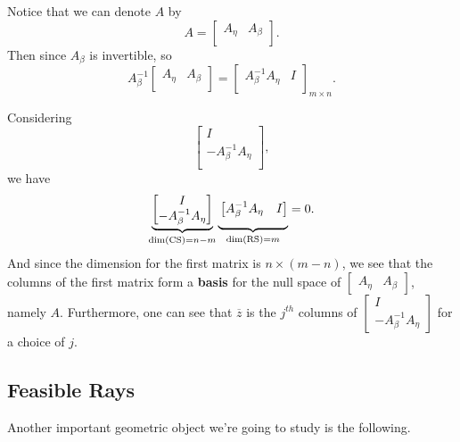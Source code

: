 \begin{note}
	Notice that we can denote \(A\) by
	\[
		A = \begin{bmatrix}
			A_{\eta} & A_{\beta} \\
		\end{bmatrix}.
	\]
	Then since \(A_{\beta}\) is invertible, so
	\[
		A^{-1}_{\beta}\begin{bmatrix}
			A_{\eta} & A_{\beta} \\
		\end{bmatrix} = \begin{bmatrix}
			A^{-1}_{\beta}A_{\eta} & I \\
		\end{bmatrix}_{m\times n}.
	\]

	Considering
	\[
		\begin{bmatrix}
			I                       \\
			-A^{-1}_{\beta}A_{\eta} \\
		\end{bmatrix},
	\]
	we have
	\[
		\underbrace{
			\begin{bmatrix}
				I                       \\
				-A^{-1}_{\beta}A_{\eta} \\
			\end{bmatrix}}_{\dim(\mathrm{CS}) = n-m}
		\underbrace{\vphantom{\begin{bmatrix}\\ \\\end{bmatrix}} \begin{bmatrix}
				A^{-1}_{\beta}A_{\eta} & I \\
			\end{bmatrix}}_{\dim(\mathrm{RS})=m} = 0.
	\]
	And since the dimension for the first matrix is \(n\times (m-n)\), we see that the columns of the first matrix form a \textbf{basis} for the null space of \(\begin{bmatrix} A_{\eta} & A_{\beta}\end{bmatrix}\), namely \(A\). Furthermore, one can see that \(\overline{z}\) is the \(j^{th}\) columns of \(\begin{bmatrix} I \\ -A^{-1}_{\beta}A_{\eta}\end{bmatrix}\) for a choice of \(j\).
\end{note}

\subsection{Feasible Rays}
Another important geometric object we're going to study is the following.

